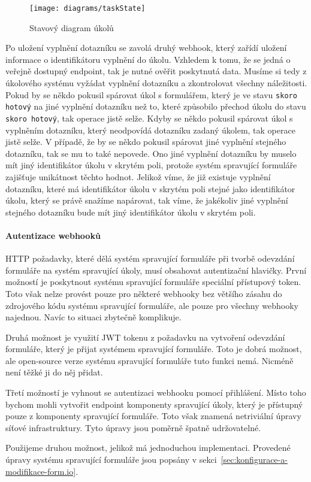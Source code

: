 \begin{figure}[H]
    \centering
    \texttt{[image: diagrams/taskState]}
    \caption{Stavový diagram úkolů}\label{fig:task-state}
\end{figure}

Po uložení vyplnění dotazníku se zavolá druhý webhook, který zařídí uložení informace o identifikátoru vyplnění do úkolu.
Vzhledem k tomu, že se jedná o veřejně dostupný endpoint, tak je nutné ověřit poskytnutá data.
Musíme si tedy z úkolového systému vyžádat vyplnění dotazníku a zkontrolovat všechny náležitosti.
Pokud by se někdo pokusil spárovat úkol s formulářem, který je ve stavu \lstinline{skoro hotový} na jiné vyplnění dotazníku než to, které způsobilo přechod úkolu do stavu \lstinline{skoro hotový}, tak operace jistě selže.
Kdyby se někdo pokusil spárovat úkol s vyplněním dotazníku, který neodpovídá dotazníku zadaný úkolem, tak operace jistě selže.
V případě, že by se někdo pokusil spárovat jiné vyplnění stejného dotazníku, tak se mu to také nepovede.
Ono jiné vyplnění dotazníku by muselo mít jiný identifikátor úkolu v skrytém poli, protože systém spravující formuláře zajišťuje unikátnost těchto hodnot.
Jelikož víme, že již existuje vyplnění dotazníku, které má identifikátor úkolu v skrytém poli stejné jako identifikátor úkolu, který se právě snažíme napárovat, tak víme, že jakékoliv jiné vyplnění stejného dotazníku bude mít jiný identifikátor úkolu v skrytém poli.

\paragraph{Autentizace webhooků}

HTTP požadavky, které dělá systém spravující formuláře při tvorbě odevzdání formuláře na systém spravující úkoly, musí obsahovat autentizační hlavičky.
První možností je poskytnout systému spravující formuláře speciální přístupový token.
Toto však nelze provést pouze pro některé webhooky bez většího zásahu do zdrojového kódu systému spravující formuláře, ale pouze pro všechny webhooky najednou.
Navíc to situaci zbytečně komplikuje.

Druhá možnost je využití JWT tokenu z požadavku na vytvoření odevzdání formuláře, který je přijat systémem spravující formuláře.
Toto je dobrá možnost, ale open-source verze systému spravující formuláře tuto funkci nemá.
Nicméně není těžké ji do něj přidat.

Třetí možností je vyhnout se autentizaci webhooku pomocí přihlášení.
Místo toho bychom mohli vytvořit endpoint komponenty spravující úkoly, který je přístupný pouze z komponenty spravující formuláře.
Toto však znamená netriviální úpravy síťové infrastruktury.
Tyto úpravy jsou poměrně špatně udržovatelné.

Použijeme druhou možnost, jelikož má jednoduchou implementaci.
Provedené úpravy systému spravující formuláře jsou popsány v sekci~\ref{sec:konfigurace-a-modifikace-form.io}.

